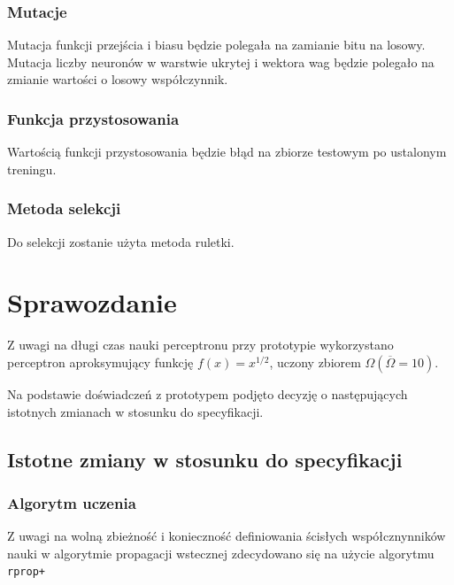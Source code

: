 \documentclass{llncs}
\begin{document}
\subsubsection{Mutacje}
Mutacja funkcji przejścia i biasu będzie polegała na zamianie bitu na losowy.
Mutacja liczby neuronów w warstwie ukrytej i wektora wag będzie polegało na zmianie
wartości o losowy współczynnik.

\subsubsection{Funkcja przystosowania}
Wartością funkcji przystosowania będzie błąd na zbiorze testowym po ustalonym treningu.

\subsubsection{Metoda selekcji}
Do selekcji zostanie użyta metoda ruletki.

\section{Sprawozdanie}

Z uwagi na długi czas nauki perceptronu przy prototypie wykorzystano perceptron aproksymujący funkcję
$f(x) = x^{1/2}$, uczony zbiorem $\Omega (\overline{\Omega} = 10)$.

Na podstawie doświadczeń z prototypem podjęto decyzję o następujących istotnych zmianach w stosunku do specyfikacji.

\subsection{Istotne zmiany w stosunku do specyfikacji}
\subsubsection{Algorytm uczenia}
Z uwagi na wolną zbieżność i konieczność definiowania ścisłych współcznynników nauki w algorytmie propagacji wstecznej
zdecydowano się na użycie algorytmu \texttt{rprop+}\cite{Riedmiller93adirect}
\end{document}
